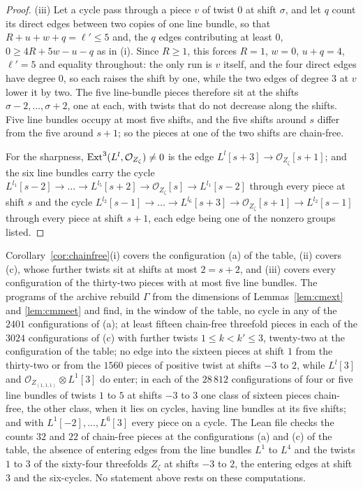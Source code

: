 \begin{proof}
(iii) Let a cycle pass through a piece $v$ of twist $0$ at shift $\sigma$, and let $q$ count its direct edges between two copies of one line bundle, so that $R+u+w+q=\ell'\le5$ and, the $q$ edges contributing at least $0$, $0\ge4R+5w-u-q$ as in (i). Since $R\ge1$, this forces $R=1$, $w=0$, $u+q=4$, $\ell'=5$ and equality throughout: the only run is $v$ itself, and the four direct edges have degree $0$, so each raises the shift by one, while the two edges of degree $3$ at $v$ lower it by two. The five line-bundle pieces therefore sit at the shifts $\sigma-2,\dots,\sigma+2$, one at each, with twists that do not decrease along the shifts. Five line bundles occupy at most five shifts, and the five shifts around $s$ differ from the five around $s+1$; so the pieces at one of the two shifts are chain-free.

For the sharpness, $\mathrm{Ext}^{3}(L^{l},\mathcal{O}_{Z_{\zeta}})\ne0$ is the edge $L^{l}[s+3]\to\mathcal{O}_{Z_{\zeta}}[s+1]$; and the six line bundles carry the cycle $L^{l_{1}}[s-2]\to\dots\to L^{l_{5}}[s+2]\to\mathcal{O}_{Z_{\zeta}}[s]\to L^{l_{1}}[s-2]$ through every piece at shift $s$ and the cycle $L^{l_{2}}[s-1]\to\dots\to L^{l_{6}}[s+3]\to\mathcal{O}_{Z_{\zeta}}[s+1]\to L^{l_{2}}[s-1]$ through every piece at shift $s+1$, each edge being one of the nonzero groups listed.
\end{proof}

\begin{remark}\label{rem:chainfreecount}
Corollary~\ref{cor:chainfree}(i) covers the configuration (a) of the table, (ii) covers (c), whose further twists sit at shifts at most $2=s+2$, and (iii) covers every configuration of the thirty-two pieces with at most five line bundles. The programs of the archive rebuild $\Gamma$ from the dimensions of Lemmas~\ref{lem:cmext} and \ref{lem:cmmeet} and find, in the window of the table, no cycle in any of the $2401$ configurations of (a); at least fifteen chain-free threefold pieces in each of the $3024$ configurations of (c) with further twists $1\le k<k'\le3$, twenty-two at the configuration of the table; no edge into the sixteen pieces at shift $1$ from the thirty-two or from the $1560$ pieces of positive twist at shifts $-3$ to $2$, while $L^{l}[3]$ and $\mathcal{O}_{Z_{(1,1,1)}}\otimes L^{1}[3]$ do enter; in each of the $28\,812$ configurations of four or five line bundles of twists $1$ to $5$ at shifts $-3$ to $3$ one class of sixteen pieces chain-free, the other class, when it lies on cycles, having line bundles at its five shifts; and with $L^{1}[-2],\dots,L^{6}[3]$ every piece on a cycle. The Lean file checks the counts $32$ and $22$ of chain-free pieces at the configurations (a) and (c) of the table, the absence of entering edges from the line bundles $L^{1}$ to $L^{4}$ and the twists $1$ to $3$ of the sixty-four threefolds $Z_{\zeta}$ at shifts $-3$ to $2$, the entering edges at shift $3$ and the six-cycles. No statement above rests on these computations.
\end{remark}

